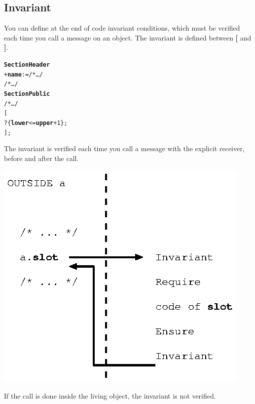 \documentclass[11pt]{mybook}
\begin{document}
\subsection{Invariant}
\label{language_reference:contract:invariant}
You can define at the end of code invariant conditions, which must be verified each time you call a message on an object.
The invariant is defined between {\bf{}[} and {\bf{}]}.
\begin{alltt}
{\bf{}Section Header}
   + {\bf{}name} := /* \ldots */
   /* \ldots */
{\bf{}Section Public}
   /* \ldots */
 [
    ? \{{\bf{}lower} <= {\bf{}upper} + 1\};
 ];
\end{alltt}

The invariant is verified each time you call a message with the explicit receiver, before and after the call.
\begin{center}
\includegraphics[scale=1.3]{figures/invariant1}
\end{center}
If the call is done inside the living object, the invariant is not verified.
\end{document}
